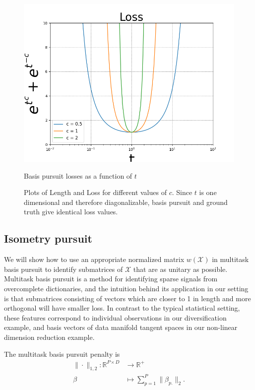 \begin{figure}[htbp]
    \begin{minipage}{0.32\textwidth}
        \centering
        \includegraphics[width=\textwidth]{../figures/Figure_1b.png}
        \caption{Basis pursuit losses as a function of $t$}
        \label{fig:loss}
    \end{minipage}
    \caption{Plots of Length and Loss for different values of $c$.
    Since $t$ is one dimensional and therefore diagonalizable, basis pursuit and ground truth give identical loss values.}
    \label{fig:results}
\end{figure}

\subsection{Isometry pursuit}

We will show how to use an appropriate normalized matrix $w(\mathcal X)$ in multitask basis pursuit to identify submatrices of $\mathcal X$ that are as unitary as possible.
Multitask basis pursuit is a method for identifying sparse signals from overcomplete dictionaries, and the intuition behind its application in our setting is that submatrices consisting of vectors which are closer to 1 in length and more orthogonal will have smaller loss.
In contrast to the typical statistical setting, these features correspond to individual observations in our diversification example, and basis vectors of data manifold tangent spaces in our non-linear dimension reduction example.

The multitask basis pursuit penalty is %
\begin{align}
\label{eq:bp}
\| \cdot \|_{1,2}: \mathbb R^{P \times D} &\to \mathbb R^+ \\ 
\beta &\mapsto  \sum_{p=1}^P  \|\beta_{p.}\|_2.
\end{align}

